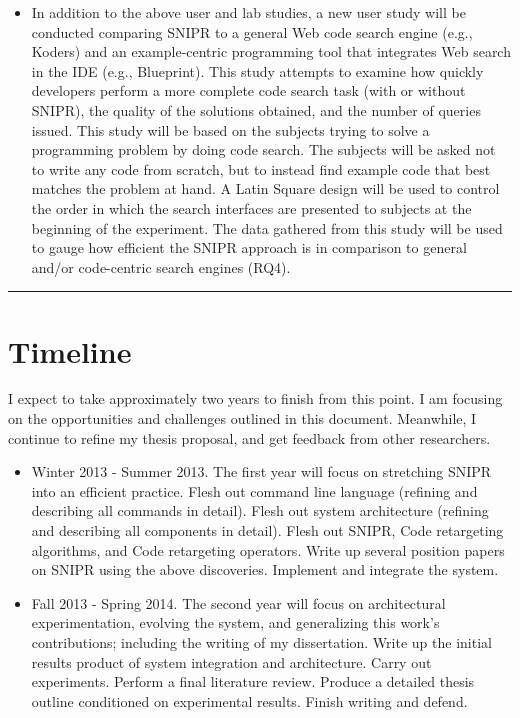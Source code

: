 \begin{itemize}
\item In addition to the above user and lab studies, a new user study will be conducted comparing \uppercase{SnipR} to a general Web code search engine (e.g., Koders) and an example-centric programming tool that integrates Web search in the IDE (e.g., Blueprint). This study attempts to examine how quickly developers perform a more complete code search task (with or without \uppercase{SnipR}), the quality of the solutions obtained, and the number of queries issued. This study will be based on the subjects trying to solve a programming problem by doing code search. The subjects will be asked not to write any code from scratch, but to instead find example code that best matches the problem at hand. A Latin Square design will be used to control the order in which the search interfaces are presented to subjects at the beginning of the experiment. The data gathered from this study will be used to gauge how efficient the \uppercase{SnipR} approach is in comparison to general and/or code-centric search engines (RQ4).     
\end{itemize}

\fancybreak{\pfbreakdisplay}

\section{Timeline}
\label{sec:workplan}

I expect to take approximately two years to finish from this point. I am 
focusing on the opportunities and challenges outlined in this document. 
Meanwhile, I continue to refine my thesis proposal, and get feedback from other 
researchers. 

\begin{itemize}
\item Winter 2013 - Summer 2013. The first year will focus on stretching 
    \uppercase{SnipR} into an efficient practice.
    \subitem Flesh out command line language (refining and describing all 
    commands in detail).
    \subitem Flesh out system architecture (refining and describing all 
    components in detail).
    \subitem Flesh out \uppercase{SnipR}, Code retargeting algorithms, and Code retargeting 
	 operators.  
    \subitem Write up several position papers on \uppercase{SnipR} using the above discoveries.
    \subitem Implement and integrate the system.
\item Fall 2013 - Spring 2014. The second year will focus on architectural 
    experimentation, evolving the system, and generalizing this work's 
    contributions; including the writing of my dissertation.
    \subitem Write up the initial results product of system integration and 
    architecture.
    \subitem Carry out experiments.
    \subitem Perform a final literature review. 
    \subitem Produce a detailed thesis outline conditioned on experimental 
    results.
    \subitem Finish writing and defend.
\end{itemize}

